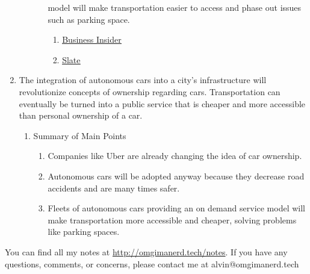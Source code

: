 \documentclass{article}
\begin{document}
\begin{enumerate}
\begin{enumerate}
\begin{enumerate}
        model will make transportation easier to access and phase out issues
        such as parking space.
      \begin{enumerate}
        \item \href{http://www.businessinsider.com/why-no-one-will-own-a-car-in-25-years-2015-6}{\underline{Business Insider}}
        \item \href{http://www.slate.com/articles/technology/future_tense/2016/10/self_driving_cars_effects_on_cities_depend_on_who_owns_them.html}{\underline{Slate}}
      \end{enumerate}
    \end{enumerate}
  \end{enumerate}
  \item The integration of autonomous cars into a city's infrastructure will
    revolutionize concepts of ownership regarding cars. Transportation can
    eventually be turned into a public service that is cheaper and more
    accessible than personal ownership of a car.
  \begin{enumerate}
    \item Summary of Main Points
    \begin{enumerate}
      \item Companies like Uber are already changing the idea of car ownership.
      \item Autonomous cars will be adopted anyway because they decrease road
        accidents and are many times safer.
      \item Fleets of autonomous cars providing an on demand service model will
        make transportation more accessible and cheaper, solving problems like
        parking spaces.
    \end{enumerate}
  \end{enumerate}
\end{enumerate}

\begin{center}
  You can find all my notes at \url{http://omgimanerd.tech/notes}. If you have
  any questions, comments, or concerns, please contact me at
  alvin@omgimanerd.tech
\end{center}
\end{document}
